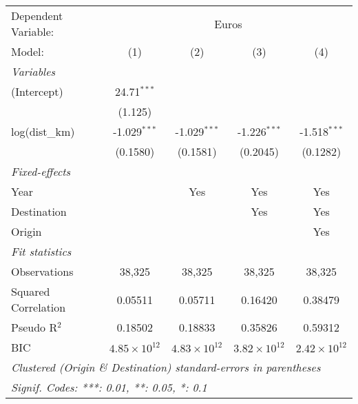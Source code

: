 
\begingroup
\centering
\begin{tabular}{lcccc}
   \tabularnewline \midrule \midrule
   Dependent Variable: & \multicolumn{4}{c}{Euros}\\
   Model:              & (1)                   & (2)                   & (3)                   & (4)\\  
   \midrule
   \emph{Variables}\\
   (Intercept)         & 24.71$^{***}$         &                       &                       &   \\   
                       & (1.125)               &                       &                       &   \\   
   log(dist\_km)       & -1.029$^{***}$        & -1.029$^{***}$        & -1.226$^{***}$        & -1.518$^{***}$\\   
                       & (0.1580)              & (0.1581)              & (0.2045)              & (0.1282)\\   
   \midrule
   \emph{Fixed-effects}\\
   Year                &                       & Yes                   & Yes                   & Yes\\  
   Destination         &                       &                       & Yes                   & Yes\\  
   Origin              &                       &                       &                       & Yes\\  
   \midrule
   \emph{Fit statistics}\\
   Observations        & 38,325                & 38,325                & 38,325                & 38,325\\  
   Squared Correlation & 0.05511               & 0.05711               & 0.16420               & 0.38479\\  
   Pseudo R$^2$        & 0.18502               & 0.18833               & 0.35826               & 0.59312\\  
   BIC                 & $4.85\times 10^{12}$  & $4.83\times 10^{12}$  & $3.82\times 10^{12}$  & $2.42\times 10^{12}$\\   
   \midrule \midrule
   \multicolumn{5}{l}{\emph{Clustered (Origin \& Destination) standard-errors in parentheses}}\\
   \multicolumn{5}{l}{\emph{Signif. Codes: ***: 0.01, **: 0.05, *: 0.1}}\\
\end{tabular}
\par\endgroup



